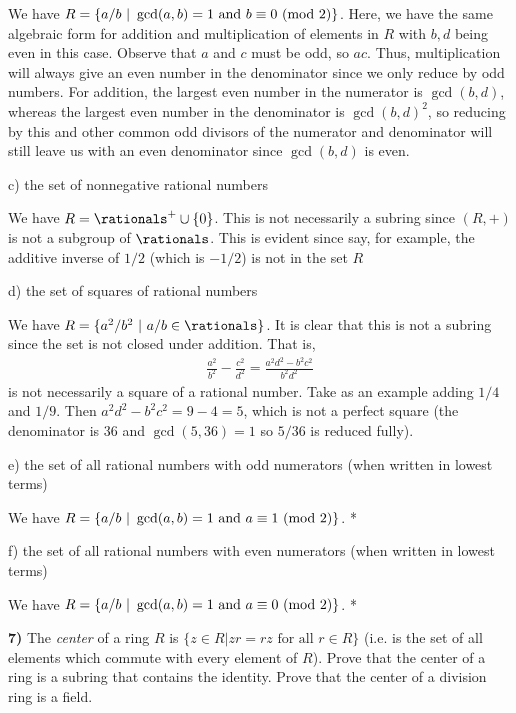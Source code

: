 \documentclass[12pt,a4paper]{article}
\newcommand{\prob}[2]{\textbf{#1)} #2}
\begin{document}
We have $R = \{a/b ~ | ~ \gcd(a,b) = 1 \text{ and } b \equiv 0 ~({\rm mod} ~ 2)\}$. Here, we have the same algebraic form for addition and multiplication of elements in $R$ with $b,d$ being even in this case. Observe that $a$ and $c$ must be odd, so $ac$. Thus, multiplication will always give an even number in the denominator since we only reduce by odd numbers. For addition, the largest even number in the numerator is $\gcd(b,d)$, whereas the largest even number in the denominator is $\gcd(b,d)^2$, so reducing by this and other common odd divisors of the numerator and denominator will still leave us with an even denominator since $\gcd(b,d)$ is even.

c) the set of nonnegative rational numbers

We have $R = \rationals^{+} \cup \{0\}$. This is not necessarily a subring since $(R,+)$ is not a subgroup of $\rationals$. This is evident since say, for example, the additive inverse of $1/2$ (which is $-1/2$) is not in the set $R$

d) the set of squares of rational numbers

We have $R = \{a^2/b^2 ~ | ~ a/b \in \rationals\}$. It is clear that this is not a subring since the set is not closed under addition. That is,
\begin{align*}
\frac{a^2}{b^2} - \frac{c^2}{d^2} = \frac{a^2d^2 - b^2c^2}{b^2d^2}
\end{align*}
is not necessarily a square of a rational number. Take as an example adding $1/4$ and $1/9$. Then $a^2d^2 - b^2c^2 = 9 - 4 = 5$, which is not a perfect square (the denominator is $36$ and $\gcd(5,36) = 1$ so $5/36$ is reduced fully).

e) the set of all rational numbers with odd numerators (when written in lowest terms)

We have $R = \{a/b ~ | ~ \gcd(a,b) = 1 \text{ and } a \equiv 1 ~ ({\rm mod} ~ 2)\}$. *

f) the set of all rational numbers with even numerators (when written in lowest terms)

We have $R = \{a/b ~ | ~ \gcd(a,b) = 1 \text{ and } a \equiv 0 ~ ({\rm mod} ~ 2)\}$. *

\prob{7}{The \textit{center} of a ring $R$ is $\{z \in R | zr = rz \text{ for all } r \in R\}$ (i.e. is the set of all elements which commute with every element of $R$). Prove that the center of a ring is a subring that contains the identity. Prove that the center of a division ring is a field.}
\end{document}
